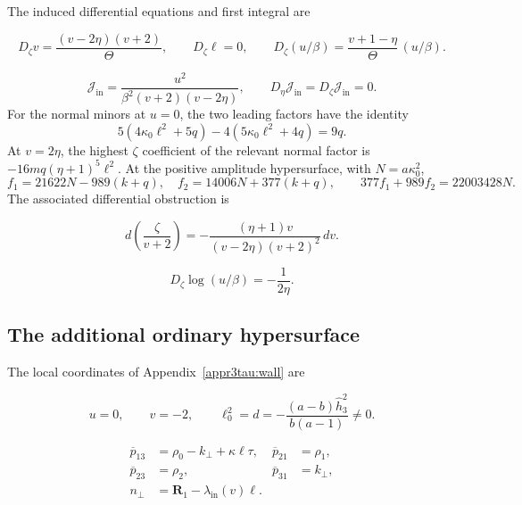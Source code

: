 The induced differential equations and first integral are

\begin{equation}\label{supp:appr3:ordinaryconnection}
 D_\zeta v=\frac{(v-2\eta )(v+2)}{\Theta},\qquad D_\zeta \ell=0,\qquad
 D_\zeta (u/\beta)=\frac{v+1-\eta }{\Theta}\,(u/\beta).
\end{equation}

\[
 \mathcal J_{\mathrm{in}}=
 \frac{u^2}{\beta^2(v+2)(v-2\eta)},\qquad
 D_\eta\mathcal J_{\mathrm{in}}=D_\zeta\mathcal J_{\mathrm{in}}=0.
\]
For the normal minors at $u=0$, the two leading factors have the
identity
\[
 5(4\kappa_0\ell^2+5q)-4(5\kappa_0\ell^2+4q)=9q.
\]
At $v=2\eta$, the highest $\zeta$ coefficient of the relevant
normal factor is $-16mq(\eta+1)^5\ell^2$.
At the positive amplitude hypersurface, with $N=a\kappa_0^2$,
\[
 f_1=21622N-989(k+q),\quad f_2=14006N+377(k+q),
 \qquad 377f_1+989f_2=22003428N.
\]
The associated differential obstruction is

\begin{equation}\label{supp:r3:residue-identity}
 d\left(\frac{\zeta}{v+2}\right)
 =-\frac{(\eta+1)v}{(v-2\eta)(v+2)^2}\,dv.
\end{equation}

\begin{equation}\label{supp:r3:logarithmic-obstruction}
 D_\zeta\log(u/\beta)=-\frac1{2\eta}.
\end{equation}

\subsection{The additional ordinary hypersurface}

The local coordinates of Appendix~\ref{appr3tau:wall} are

\begin{equation}\label{supp:appr3tau:wallpoint}
 u=0,\qquad v=-2,\qquad
 \ell_0^2=d=-\frac{(a-b)\widehat h_3 ^2}{b(a-1)}\ne0.
\end{equation}

\begin{equation}\label{supp:appr3tau:coordinates}
 \begin{aligned}
 \overline p_{13}&=\rho_0-k_\perp+\kappa\ell\tau,& \overline p_{21}&=\rho_1,\\
 \overline p_{23}&=\rho_2,& \overline p_{31}&=k_\perp,\\
 n_\perp&=\boldsymbol R_1-\lambda_{\mathrm{in}}(v)\ell.
 \end{aligned}
\end{equation}

